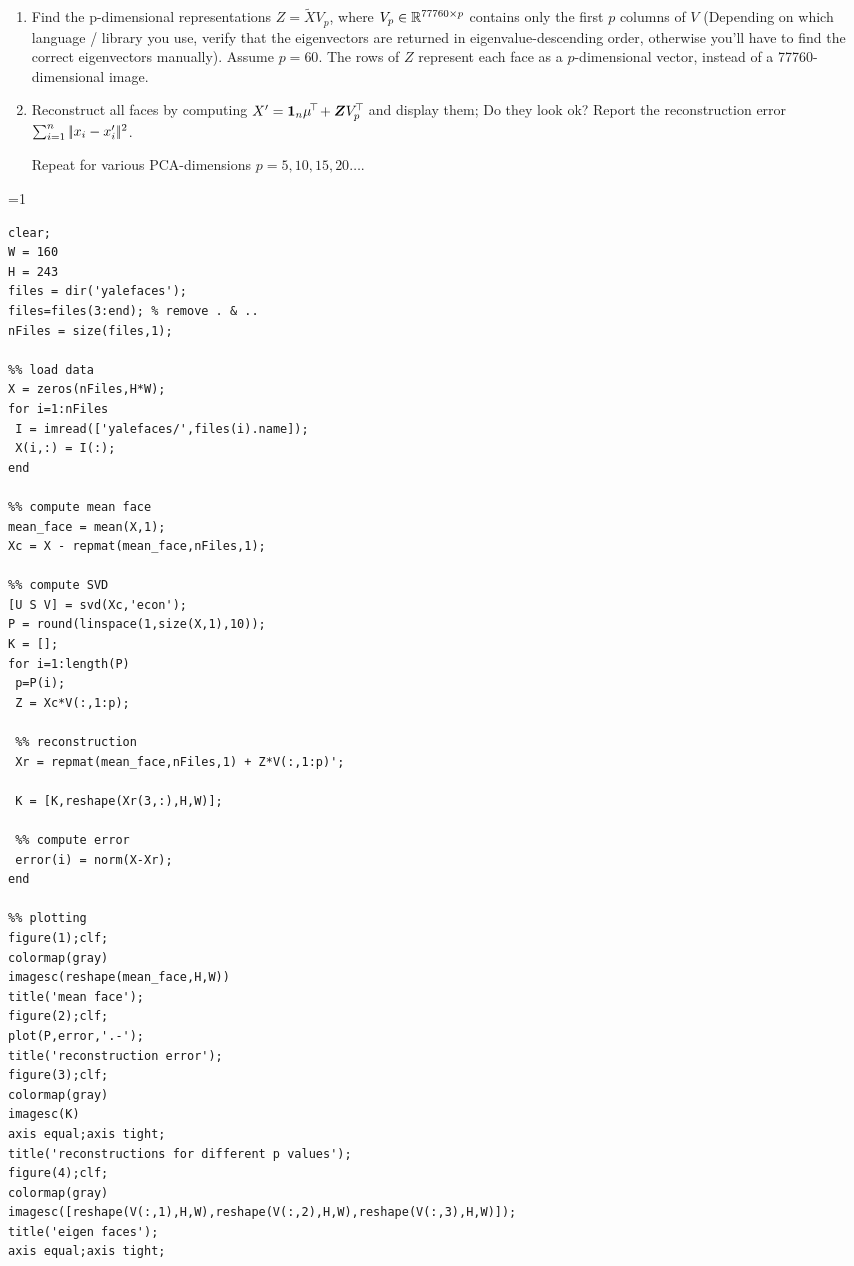\begin{enumerate}
\item Find the p-dimensional representations $Z = \tilde X V_p$, where $V_p \in
{\mathbb{R}}^{77760\times p}$ contains only the first $p$ columns of $V$ (Depending on
which language / library you use, verify that the eigenvectors are returned in
eigenvalue-descending order, otherwise you'll have to find the correct
eigenvectors manually). Assume $p=60$. The rows of $Z$ represent each face as a
$p$-dimensional vector, instead of a 77760-dimensional image.

\item Reconstruct all faces by computing $X' = {{\bf 1}}_n \mu^{\!\top\!} + \boldsymbol Z V_p^{\!\top\!}$ and
display them; Do they look ok? Report the reconstruction error $\sum_{i=1}^n
|\!|x_i - x'_i|\!|^2$.

Repeat for various PCA-dimensions $p=5, 10, 15, 20\ldots$.


\end{enumerate}

\ifnum\value{solutions}=1
\begin{solution}
\begin{verbatim}
clear;
W = 160
H = 243
files = dir('yalefaces');
files=files(3:end); % remove . & ..
nFiles = size(files,1);

%% load data
X = zeros(nFiles,H*W);
for i=1:nFiles
 I = imread(['yalefaces/',files(i).name]);
 X(i,:) = I(:);
end

%% compute mean face
mean_face = mean(X,1);
Xc = X - repmat(mean_face,nFiles,1);

%% compute SVD
[U S V] = svd(Xc,'econ');
P = round(linspace(1,size(X,1),10));
K = [];
for i=1:length(P)
 p=P(i);
 Z = Xc*V(:,1:p);
 
 %% reconstruction
 Xr = repmat(mean_face,nFiles,1) + Z*V(:,1:p)';
 
 K = [K,reshape(Xr(3,:),H,W)];
 
 %% compute error
 error(i) = norm(X-Xr);
end

%% plotting
figure(1);clf;
colormap(gray)
imagesc(reshape(mean_face,H,W))
title('mean face');
figure(2);clf;
plot(P,error,'.-');
title('reconstruction error');
figure(3);clf;
colormap(gray)
imagesc(K)
axis equal;axis tight;
title('reconstructions for different p values');
figure(4);clf;
colormap(gray)
imagesc([reshape(V(:,1),H,W),reshape(V(:,2),H,W),reshape(V(:,3),H,W)]);
title('eigen faces');
axis equal;axis tight;
\end{verbatim}
\end{solution}
\fi


\exerfoot
